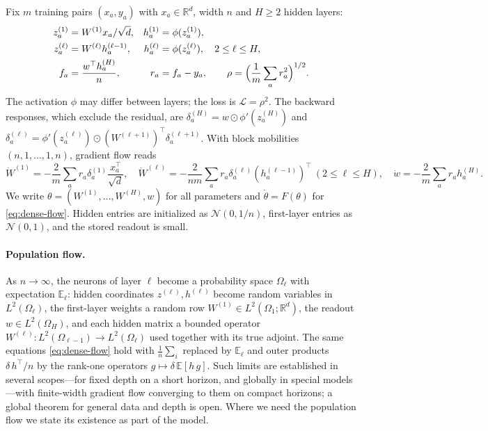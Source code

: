 \documentclass[11pt]{article}
\theoremstyle{definition}
\theoremstyle{remark}
\newcommand{\R}{\mathbb{R}}
\newcommand{\E}{\mathbb{E}}
\newcommand{\cL}{\mathcal{L}}
\newcommand{\od}{\mathbin{\odot}}
\begin{document}
Fix $m$ training pairs $(x_a,y_a)$ with $x_a\in\R^d$, width $n$ and $H\ge2$
hidden layers:
\begin{align}
 z_a^{(1)}&=W^{(1)}x_a/\sqrt d,& h_a^{(1)}&=\phi(z_a^{(1)}),\nonumber\\
 z_a^{(\ell)}&=W^{(\ell)}h_a^{(\ell-1)},&
 h_a^{(\ell)}&=\phi(z_a^{(\ell)}),\quad 2\le\ell\le H,\\
 f_a&=\frac{w^\top h_a^{(H)}}{n},& r_a&=f_a-y_a,\qquad
 \rho=\Bigl(\frac1m\sum_a r_a^2\Bigr)^{1/2}.\nonumber
\end{align}
The activation $\phi$ may differ between layers; the loss is $\cL=\rho^2$.  The
backward responses, which exclude the residual, are
$\delta_a^{(H)}=w\od\phi'(z_a^{(H)})$ and
$\delta_a^{(\ell)}=\phi'(z_a^{(\ell)})\od(W^{(\ell+1)})^\top\delta_a^{(\ell+1)}$.
With block mobilities $(n,1,\ldots,1,n)$, gradient flow reads
\begin{equation}
 \dot W^{(1)}=-\frac2m\sum_a r_a\delta_a^{(1)}\frac{x_a^\top}{\sqrt d},\quad
 \dot W^{(\ell)}=-\frac{2}{nm}\sum_a r_a\delta_a^{(\ell)}
 (h_a^{(\ell-1)})^\top\ (2\le\ell\le H),\quad
 \dot w=-\frac2m\sum_a r_a h_a^{(H)}.\label{eq:dense-flow}
\end{equation}
We write $\theta=(W^{(1)},\ldots,W^{(H)},w)$ for all parameters and
$\dot\theta=F(\theta)$ for \eqref{eq:dense-flow}.  Hidden entries are initialized
as $\mathcal N(0,1/n)$, first-layer entries as $\mathcal N(0,1)$, and the stored
readout is small.

\paragraph{Population flow.}
As $n\to\infty$, the neurons of layer $\ell$ become a probability space
$\Omega_\ell$ with expectation $\E_\ell$: hidden coordinates $z^{(\ell)},h^{(\ell)}$
become random variables in $L^2(\Omega_\ell)$, the first-layer weights a random
row $W^{(1)}\in L^2(\Omega_1;\R^d)$, the readout $w\in L^2(\Omega_H)$, and each
hidden matrix a bounded operator $W^{(\ell)}:L^2(\Omega_{\ell-1})\to L^2(\Omega_\ell)$
used together with its true adjoint.  The same equations \eqref{eq:dense-flow}
hold with $\frac1n\sum_i$ replaced by $\E_\ell$ and outer products
$\delta\,h^\top/n$ by the rank-one operators $g\mapsto\delta\,\E[h\,g]$.  Such
limits are established in several scopes---for fixed depth on a short horizon,
and globally in special models---with finite-width gradient flow converging to
them on compact horizons; a global theorem for general data and depth is open.
Where we need the population flow we state its existence as part of the model.
\end{document}
